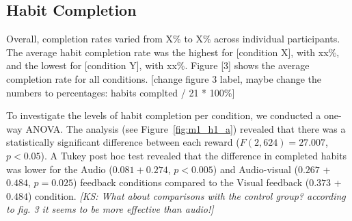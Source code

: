 \documentclass{scaffold/sigchi}
\begin{document}
\subsection{Habit Completion}
Overall, completion rates varied from X\% to X\% across individual participants. The average habit completion rate was the highest for [condition X], with xx\%, and the lowest for [condition Y], with xx\%. Figure [3] shows the average completion rate for all conditions. [change figure 3 label, maybe change the numbers to percentages: habits complted / 21 * 100\%]

To investigate the levels of habit completion per condition, we conducted a one-way ANOVA. The analysis (see Figure~\ref{fig:m1_h1_a}) revealed that there was a statistically significant difference between each reward ($F(2,624) = 27.007$, $p < 0.05$). A Tukey post hoc test revealed that the difference in completed habits was lower for the Audio ($0.081 + 0.274$, $p < 0.005$) and Audio-visual ($0.267$ + $0.484$, $p = 0.025$) feedback conditions compared to the Visual feedback ($0.373$ + $0.484$) condition. \emph{[KS: What about comparisons with the control group? according to fig. 3 it seems to be more effective than audio!]}





\end{document}
